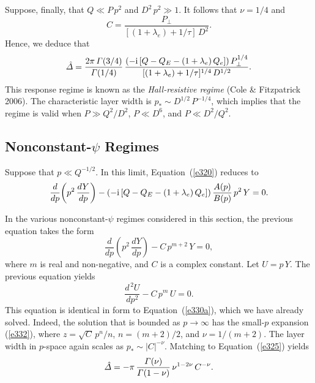 \documentclass[notitlepage,12pt]{article}
\begin{document}
Suppose, finally, that $Q\ll P\,p^2$ and $D^2\,p^2\gg 1$. It follows that $\nu=1/4$ and
\begin{equation}
C = \frac{P_\perp}{[(1+\lambda_e)+1/\tau]\,D^2}.
\end{equation}
Hence, we deduce that 
\begin{equation}\label{hr}
\hat{\mit\Delta}= \frac{2\pi\,{\mit\Gamma}(3/4)}{{\mit\Gamma}(1/4)}\,\frac{(-{\rm i}\,[Q-Q_E-(1+\lambda_e)\,Q_e])\,P_\perp^{1/4}}{[(1+\lambda_e)+1/\tau]^{1/4}\,D^{1/2}}.
\end{equation}
This response regime is known as the {\em Hall-resistive regime}\/ (Cole \& Fitzpatrick 2006). The characteristic
layer width is $p_\ast \sim D^{1/2}\,P^{-1/4}$, which implies that the regime is valid when $P\gg Q^2/D^2$,
$P\ll D^6$, and $P\ll D^2/Q^2$. 

\subsection{Nonconstant-$\psi$ Regimes}
Suppose that $p\ll Q^{-1/2}$. In this limit, Equation~(\ref{e320}) reduces to 
\begin{equation}
\frac{d}{dp}\!\left(p^2\,\frac{dY}{dp}\right)-(-{\rm i}\,[Q-Q_E-(1+\lambda_e)\,Q_e])\,\frac{A(p)}{B(p)}\,p^2\,Y=0.
\end{equation}

In the various nonconstant-$\psi$ regimes considered in this section, the previous equation takes the form
\begin{equation}
\frac{d}{dp}\!\left(p^2\,\frac{dY}{dp}\right)-C\,p^{m+2}\,Y = 0,
\end{equation}
where $m$ is real and non-negative, and $C$ is a complex constant. Let $U=p\,Y$. The previous equation
yields
\begin{equation}
\frac{d^{\,2} U}{dp^2} - C\,p^m\,U = 0.
\end{equation}
This equation is identical in form to Equation~(\ref{e330a}), which we have already solved. Indeed, the solution that
is bounded as $p\rightarrow\infty$ has the small-$p$ expansion (\ref{e332}), where $z=\sqrt{C}\,p^n/n$, 
$n=(m+2)/2$, and $\nu=1/(m+2)$. The layer width in $p$-space again scales as $p_\ast\sim |C|^{-\nu}$. 
Matching to Equation~(\ref{e325}) yields
\begin{equation}
\hat{\mit\Delta} = -\pi\,\frac{{\mit\Gamma}(\nu)}{{\mit\Gamma}(1-\nu)}\,\nu^{1-2\nu}\,C^{-\nu}.
\end{equation}
\end{document}
